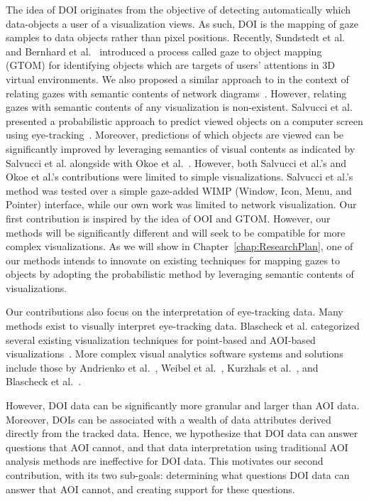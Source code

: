 The idea of DOI originates from the objective of detecting automatically which data-objects a user of a visualization views. As such, DOI is the mapping of gaze samples to data objects rather than pixel positions. Recently, Sundstedt et al.~\cite{Sun13} and Bernhard et al.~\cite{Bern14} introduced a process called gaze to object mapping (GTOM) for identifying objects which are targets of users' attentions in 3D virtual environments. We also proposed a similar approach to in the context of relating gazes with semantic contents of network diagrams~\cite{Okoe14}. However, relating gazes with semantic contents of any visualization is non-existent. Salvucci et al. presented a probabilistic approach to predict viewed objects on a computer screen using eye-tracking~\cite{Sal00}. Moreover, predictions of which objects are viewed can be significantly improved by leveraging semantics of visual contents as indicated by Salvucci et al. alongside with Okoe et al.~\cite{Okoe14}. However, both Salvucci et al.'s and Okoe et al.'s contributions were limited to simple visualizations. Salvucci et al.'s method was tested over a simple gaze-added WIMP (Window, Icon, Menu, and Pointer) interface, while our own work was limited to network visualization. Our first contribution is inspired by the idea of OOI and GTOM. However, our methods will be significantly different and will seek to be compatible for more complex visualizations. As we will show in Chapter~\ref{chap:ResearchPlan}, one of our methods intends to innovate on existing techniques for mapping gazes to objects by adopting the probabilistic method by leveraging semantic contents of visualizations. 

Our contributions also focus on the interpretation of eye-tracking data. Many methods exist to visually interpret eye-tracking data.  Blascheck et al. categorized several existing visualization techniques for point-based and AOI-based visualizations~\cite{Bla14}. More complex visual analytics software systems and solutions include those by Andrienko et al.~\cite{And12}, Weibel et al.~\cite{Wei12}, Kurzhals et al.~\cite{Kur14}, and Blascheck et al.~\cite{Bla16}.  

However, DOI data can be significantly more granular and larger than AOI data. Moreover, DOIs can be associated with a wealth of data attributes derived directly from the tracked data. Hence, we hypothesize that DOI data can answer questions that AOI cannot, and that data interpretation using traditional AOI analysis methods are ineffective for DOI data. This motivates our second contribution, with its two sub-goals: determining what questions DOI data can answer that AOI cannot, and creating support for these questions. 

